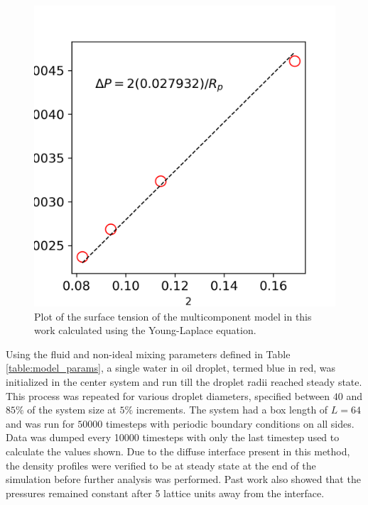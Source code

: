 \begin{figure}[h]
    \centering
    \includegraphics[scale = 0.5]{figures/model_validation/surface_tension.png}
    \caption{Plot of the surface tension of the multicomponent model in this work calculated using the 
    Young-Laplace equation.}
    \label{fig:young_laplace_valid}
\end{figure}

Using the fluid and non-ideal mixing parameters defined in Table \ref{table:model_params}, a single water in oil 
droplet, termed blue in red, was initialized in the center system and run till the droplet radii reached steady state. 
This process was repeated for various droplet diameters, specified between $40$ and $85 \%$ of the system size at $5\%$ 
increments. The system had a box length of $L = 64$ and was run for $50000$ timesteps with periodic boundary conditions 
on all sides. Data was dumped every 10000 timesteps with only the last timestep used to calculate the values shown. Due 
to the diffuse interface present in this method, the density profiles were verified to be at steady state at the end of 
the simulation before further analysis was performed. \cite{frijters_effects_2012} Past work also showed that the 
pressures remained constant after 5 lattice units away from the interface. \cite{frijters_effects_2012} 

